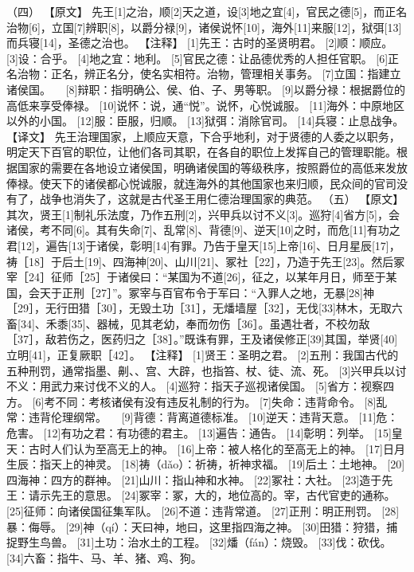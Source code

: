 \documentclass[a4paper,12pt,UTF8,twoside]{ctexbook}
\begin{document}
（四）
【原文】
先王[1]之治，顺[2]天之道，设[3]地之宜[4]，官民之德[5]，而正名治物[6]，立国[7]辨职[8]，以爵分禄[9]，诸侯说怀[10]，海外[11]来服[12]，狱弭[13]而兵寝[14]，圣德之治也。
【注释】
[1]先王：古时的圣贤明君。
[2]顺：顺应。
[3]设：合乎。
[4]地之宜：地利。
[5]官民之德：让品德优秀的人担任官职。
[6]正名治物：正名，辨正名分，使名实相符。治物，管理相关事务。
[7]立国：指建立诸侯国。
　[8]辩职：指明确公、侯、伯、子、男等职。
[9]以爵分禄：根据爵位的高低来享受俸禄。
[10]说怀：说，通“悦”。说怀，心悦诚服。
[11]海外：中原地区以外的小国。
[12]服：臣服，归顺。
[13]狱弭：消除官司。
[14]兵寝：止息战争。
【译文】
先王治理国家，上顺应天意，下合乎地利，对于贤德的人委之以职务，明定天下百官的职位，让他们各司其职，在各自的职位上发挥自己的管理职能。根据国家的需要在各地设立诸侯国，明确诸侯国的等级秩序，按照爵位的高低来发放俸禄。使天下的诸侯都心悦诚服，就连海外的其他国家也来归顺，民众间的官司没有了，战争也消失了，这就是古代圣王用仁德治理国家的典范。
（五）
【原文】
其次，贤王[1]制礼乐法度，乃作五刑[2]，兴甲兵以讨不义[3]。巡狩[4]省方[5]，会诸侯，考不同[6]。其有失命[7]、乱常[8]、背德[9]、逆天[10]之时，而危[11]有功之君[12]，遍告[13]于诸侯，彰明[14]有罪。乃告于皇天[15]上帝[16]、日月星辰[17]，祷［18］于后土[19]、四海神[20]、山川[21]、冢社［22］，乃造于先王[23]。然后冢宰［24］征师［25］于诸侯曰：“某国为不道[26]，征之，以某年月日，师至于某国，会天于正刑［27］”。冢宰与百官布令于军曰：“入罪人之地，无暴[28]神［29］，无行田猎［30］，无毁土功［31］，无燔墙屋［32］，无伐[33]林木，无取六畜[34]、禾黍[35]、器械，见其老幼，奉而勿伤［36］。虽遇壮者，不校勿敌［37］，敌若伤之，医药归之［38］。”既诛有罪，王及诸侯修正[39]其国，举贤[40]立明[41]，正复厥职［42］。
【注释】
[1]贤王：圣明之君。
[2]五刑：我国古代的五种刑罚，通常指墨、劓、、宫、大辟，也指笞、杖、徒、流、死。
[3]兴甲兵以讨不义：用武力来讨伐不义的人。
[4]巡狩：指天子巡视诸侯国。
[5]省方：视察四方。
[6]考不同：考核诸侯有没有违反礼制的行为。
[7]失命：违背命令。
[8]乱常：违背伦理纲常。
　[9]背德：背离道德标准。
[10]逆天：违背天意。
[11]危：危害。
[12]有功之君：有功德的君主。
[13]遍告：通告。
[14]彰明：列举。
[15]皇天：古时人们认为至高无上的神。
[16]上帝：被人格化的至高无上的神。
[17]日月生辰：指天上的神灵。
[18]祷（dǎo）：祈祷，祈神求福。
[19]后土：土地神。
[20]四海神：四方的群神。
[21]山川：指山神和水神。
[22]冢社：大社。
[23]造于先王：请示先王的意思。
[24]冢宰：冢，大的，地位高的。宰，古代官吏的通称。
[25]征师：向诸侯国征集军队。
[26]不道：违背常道。
[27]正刑：明正刑罚。
[28]暴：侮辱。
[29]神（qí）：天曰神，地曰，这里指四海之神。
[30]田猎：狩猎，捕捉野生鸟兽。
[31]土功：治水土的工程。
[32]燔（fán）：烧毁。
[33]伐：砍伐。
[34]六畜：指牛、马、羊、猪、鸡、狗。
\end{document}

